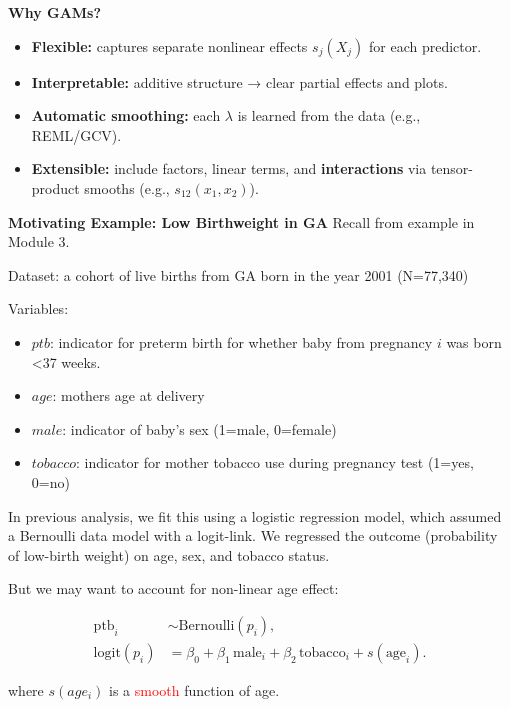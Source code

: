 \documentclass[
  letterpaper,
  DIV=11,
  numbers=noendperiod]{scrreprt}
\providecommand{\tightlist}{%
  \setlength{\itemsep}{0pt}\setlength{\parskip}{0pt}}\usepackage{longtable,booktabs,array}
\begin{document}
\begin{tcolorbox}
\textbf{Why GAMs?}

\begin{itemize}
\tightlist
\item
  \textbf{Flexible:} captures separate nonlinear effects \(s_j(X_j)\)
  for each predictor.
\item
  \textbf{Interpretable:} additive structure → clear partial effects and
  plots.
\item
  \textbf{Automatic smoothing:} each \(\lambda\) is learned from the
  data (e.g., REML/GCV).
\item
  \textbf{Extensible:} include factors, linear terms, and
  \textbf{interactions} via tensor-product smooths (e.g.,
  \(s_{12}(x_1,x_2)\)).
\end{itemize}

\end{tcolorbox}

\textbf{Motivating Example: Low Birthweight in GA} Recall from example
in Module 3.

Dataset: a cohort of live births from GA born in the year 2001
(N=77,340)

Variables:

\begin{itemize}
\item
  \(ptb\): indicator for preterm birth for whether baby from pregnancy
  \(i\) was born \textless37 weeks.
\item
  \(age\): mothers age at delivery
\item
  \(male\): indicator of baby's sex (1=male, 0=female)
\item
  \(tobacco\): indicator for mother tobacco use during pregnancy test
  (1=yes, 0=no)
\end{itemize}

In previous analysis, we fit this using a logistic regression model,
which assumed a Bernoulli data model with a logit-link. We regressed the
outcome (probability of low-birth weight) on age, sex, and tobacco
status.

But we may want to account for non-linear age effect:

\[
\begin{aligned}
\text{ptb}_i &\sim \text{Bernoulli}(p_i),\\
\text{logit}(p_i) &= \beta_0 + \beta_1\,\text{male}_i + \beta_2\,\text{tobacco}_i + s(\text{age}_i).
\end{aligned}
\]

where \(s(age_i)\) is a \textcolor{red}{smooth} function of age.
\end{document}
